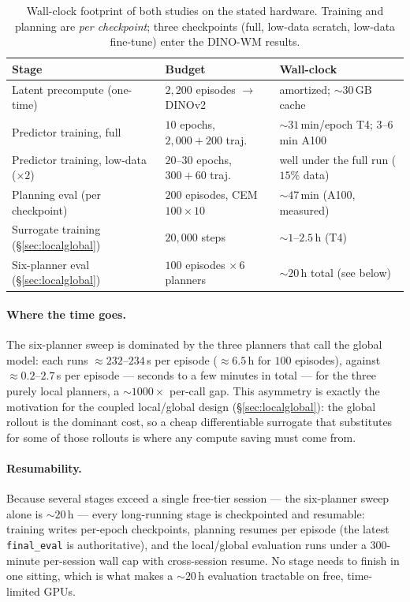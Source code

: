 \documentclass[11pt,a4paper]{article}
\begin{document}
\begin{table}[h]
\centering
\small
\begin{tabular}{@{}lll@{}}
\toprule
Stage & Budget & Wall-clock \\
\midrule
Latent precompute (one-time)         & $2{,}200$ episodes $\to$ DINOv2      & amortized; ${\sim}30$\,GB cache \\
Predictor training, full             & $10$ epochs, $2{,}000{+}200$ traj.  & ${\sim}31$\,min/epoch T4; $3$--$6$\,min A100 \\
Predictor training, low-data ($\times2$) & $20$--$30$ epochs, $300{+}60$ traj. & well under the full run ($15\%$ data) \\
Planning eval (per checkpoint)       & $200$ episodes, CEM $100{\times}10$  & ${\sim}47$\,min (A100, measured) \\
Surrogate training (\S\ref{sec:localglobal}) & $20{,}000$ steps             & ${\sim}1$--$2.5$\,h (T4) \\
Six-planner eval (\S\ref{sec:localglobal})   & $100$ episodes $\times\,6$ planners & ${\sim}20$\,h total (see below) \\
\bottomrule
\end{tabular}
\caption{Wall-clock footprint of both studies on the stated hardware. Training
and planning are \emph{per checkpoint}; three checkpoints (full, low-data
scratch, low-data fine-tune) enter the DINO-WM results.}
\label{tab:resources}
\end{table}

\paragraph{Where the time goes.} The six-planner sweep is dominated by the three
planners that call the global model: each runs ${\approx}232$--$234$\,s per
episode (${\approx}6.5$\,h for $100$ episodes), against ${\approx}0.2$--$2.7$\,s
per episode --- seconds to a few minutes in total --- for the three purely local
planners, a ${\sim}1000\times$ per-call gap. This asymmetry is exactly the
motivation for the coupled local/global design (\S\ref{sec:localglobal}): the
global rollout is the dominant cost, so a cheap differentiable surrogate that
substitutes for some of those rollouts is where any compute saving must come
from.

\paragraph{Resumability.} Because several stages exceed a single free-tier
session --- the six-planner sweep alone is ${\sim}20$\,h --- every long-running
stage is checkpointed and resumable: training writes per-epoch checkpoints,
planning resumes per episode (the latest \texttt{final\_eval} is authoritative),
and the local/global evaluation runs under a $300$-minute per-session wall cap
with cross-session resume. No stage needs to finish in one sitting, which is
what makes a ${\sim}20$\,h evaluation tractable on free, time-limited GPUs.
\end{document}
